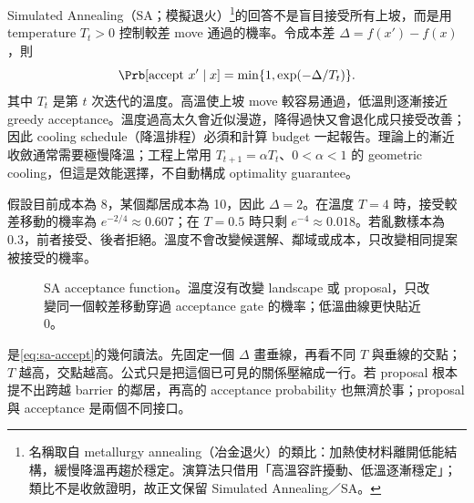 \documentclass[11pt,a4paper,oneside,openany]{book}
\begin{document}
Simulated Annealing（SA；模擬退火）\footnote{名稱取自 metallurgy annealing（冶金退火）的類比：加熱使材料離開低能結構，緩慢降溫再趨於穩定。演算法只借用「高溫容許擾動、低溫逐漸穩定」；類比不是收斂證明，故正文保留 Simulated Annealing／SA。}的回答不是盲目接受所有上坡，而是用 temperature $T_t>0$ 控制較差 move 通過的機率。令成本差 $\Delta=f(x')-f(x)$，則
\begin{equation}
 \Prb[\text{accept }x'\mid x]
 =\min\{1,\exp(-\Delta/T_t)\}.
 \label{eq:sa-accept}
\end{equation}
其中 $T_t$ 是第 $t$ 次迭代的溫度。高溫使上坡 move 較容易通過，低溫則逐漸接近 greedy acceptance。溫度過高太久會近似漫遊，降得過快又會退化成只接受改善；因此 cooling schedule（降溫排程）必須和計算 budget 一起報告。理論上的漸近收斂通常需要極慢降溫；工程上常用 $T_{t+1}=\alpha T_t$、$0<\alpha<1$ 的 geometric cooling，但這是效能選擇，不自動構成 optimality guarantee。

\begin{example}[溫度究竟改變了什麼]
假設目前成本為 8，某個鄰居成本為 10，因此 $\Delta=2$。在溫度 $T=4$ 時，接受較差移動的機率為 $e^{-2/4}\approx0.607$；在 $T=0.5$ 時只剩 $e^{-4}\approx0.018$。若亂數樣本為 0.3，前者接受、後者拒絕。溫度不會改變候選解、鄰域或成本，只改變相同提案被接受的機率。
\end{example}

\begin{figure}[htbp]
\centering
{}
\caption{SA acceptance function。溫度沒有改變 landscape 或 proposal，只改變同一個較差移動穿過 acceptance gate 的機率；低溫曲線更快貼近 0。}
\label{fig:sa-acceptance}
\end{figure}

 是\cref{eq:sa-accept}的幾何讀法。先固定一個 $\Delta$ 畫垂線，再看不同 $T$ 與垂線的交點；$T$ 越高，交點越高。公式只是把這個已可見的關係壓縮成一行。若 proposal 根本提不出跨越 barrier 的鄰居，再高的 acceptance probability 也無濟於事；proposal 與 acceptance 是兩個不同接口。
\end{document}
